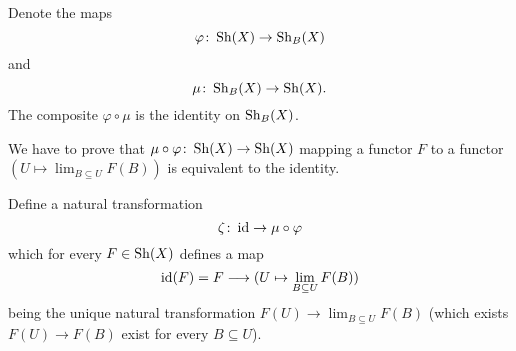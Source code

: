 \begin{exercise}{4}
    Denote the maps
    \begin{equation*}
        \varphi \colon \operatorname{Sh}(X) \rightarrow \operatorname{Sh}_B(X)
    \end{equation*}
    and
    \begin{equation*}
        \mu \colon \operatorname{Sh}_B(X) \rightarrow \operatorname{Sh}(X).
    \end{equation*}
    The composite $\varphi \circ \mu$ is the identity on $\operatorname{Sh}_B(X)$.

    We have to prove that $\mu \circ \varphi \colon \operatorname{Sh}(X) \rightarrow \operatorname{Sh}(X)$
    mapping a functor $F$ to a functor $(U \mapsto \lim_{B \subseteq U} F(B))$
    is equivalent to the identity.

    Define a natural transformation
    \begin{equation*}
        \zeta \colon \operatorname{id} \rightarrow \mu \circ \varphi
    \end{equation*}
    which for every $F \in \operatorname{Sh}(X)$ defines a map
    \begin{equation*}
        \operatorname{id}(F) = F \longrightarrow (U \mapsto \lim_{B \subseteq U} F(B))
    \end{equation*}
    being the unique natural transformation $F(U) \rightarrow \lim_{B \subseteq
    U} F(B)$ (which exists $F(U) \rightarrow F(B)$ exist for every $B \subseteq
    U$).
\end{exercise}


